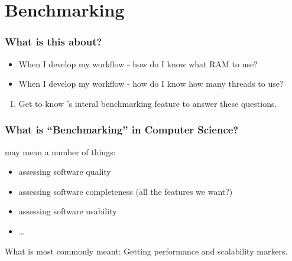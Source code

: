 \section{Benchmarking}
{   
}

\begin{frame}
	\frametitle{What is this about?}
	\begin{question}[Questions]
		\begin{itemize}
			\item When I develop my workflow - how do I know what RAM to use?
			\item When I develop my workflow - how do I know how many threads to use?
		\end{itemize}
	\end{question}
	\begin{docs}[Objectives]
		\begin{enumerate}
			\item Get to know \Snakemake's interal benchmarking feature to answer these questions.
		\end{enumerate}
	\end{docs}
\end{frame}

\begin{frame}
	\frametitle{What is ``Benchmarking'' in Computer Science?}
	 may mean a number of things:
	\begin{itemize}[<+->]
		\item assessing software quality
		\item assessing software completeness (all the features we want?)
		\item assessing software usability
		\item \ldots
	\end{itemize}
	\pause
	\begin{docs}
		What is most commonly meant: Getting performance and scalability markers.
	\end{docs}
\end{frame}

